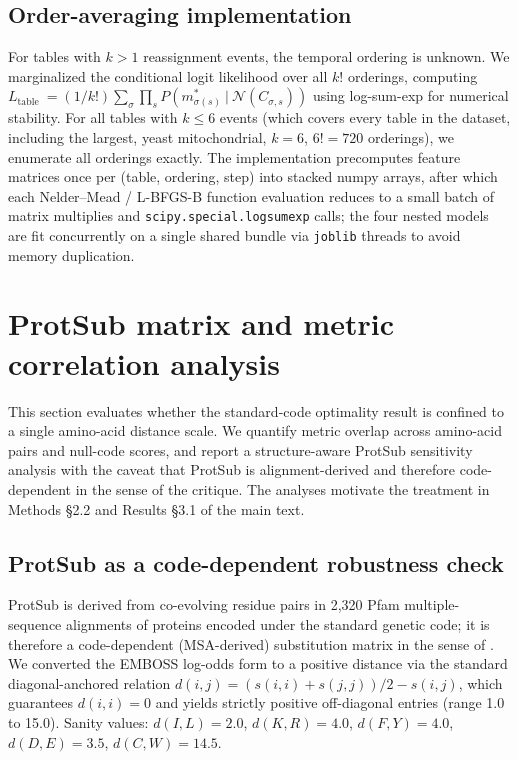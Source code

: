 \documentclass[preprint,11pt,authoryear,a4paper]{elsarticle}
\begin{document}
\subsection{Order-averaging implementation}

For tables with \(k > 1\) reassignment events, the temporal ordering is
unknown. We marginalized the conditional logit likelihood over all
\(k!\) orderings, computing
\(L_{\text{table }} = (1/k!)\sum_{\sigma}\prod_{s}P\left( m_{\sigma(s)}^{\ast}~|~\mathcal{N}(C_{\sigma,s}) \right)\)
using log-sum-exp for numerical stability. For all tables with
\(k \leq 6\) events (which covers every table in the dataset, including
the largest, yeast mitochondrial, \(k = 6\), \(6! = 720\) orderings), we
enumerate all orderings exactly. The implementation precomputes feature
matrices once per (table, ordering, step) into stacked numpy arrays,
after which each Nelder--Mead / L-BFGS-B function evaluation reduces to
a small batch of matrix multiplies and \texttt{scipy.special.logsumexp}
calls; the four nested models are fit concurrently on a single shared
bundle via \texttt{joblib} threads to avoid memory duplication.

\section{ProtSub matrix and metric correlation
analysis}\label{sec:s-protsub}

This section evaluates whether the standard-code optimality result is
confined to a single amino-acid distance scale. We quantify metric
overlap across amino-acid pairs and null-code scores, and report a
structure-aware ProtSub sensitivity analysis with the caveat that
ProtSub is alignment-derived and therefore code-dependent in the sense
of the \citep{digiulio2001} critique. The analyses motivate the
treatment in Methods §2.2 and Results §3.1 of the main text.

\subsection{ProtSub as a code-dependent robustness check}

ProtSub is derived from co-evolving residue pairs in 2,320 Pfam
multiple-sequence alignments of proteins encoded under the standard
genetic code; it is therefore a code-dependent (MSA-derived)
substitution matrix in the sense of \citep{digiulio2001}. We converted
the EMBOSS log-odds form to a positive distance via the standard
diagonal-anchored relation
\(d(i,j) = \left( s(i,i) + s(j,j) \right)/2 - s(i,j)\), which guarantees
\(d(i,i) = 0\) and yields strictly positive off-diagonal entries (range
1.0 to 15.0). Sanity values: \(d(I,L) = 2.0\), \(d(K,R) = 4.0\),
\(d(F,Y) = 4.0\), \(d(D,E) = 3.5\), \(d(C,W) = 14.5\).
\end{document}
